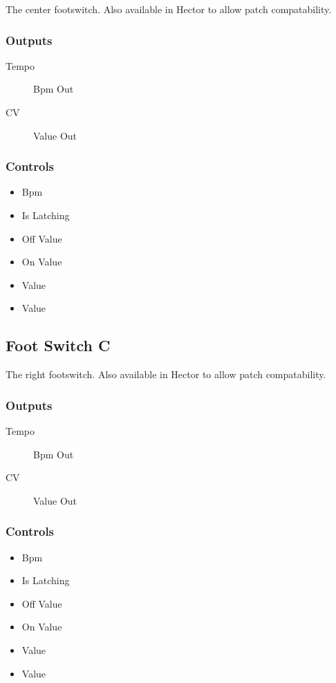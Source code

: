 The center footswitch. Also available in Hector to allow patch compatability.



\subsubsection{Outputs}
\begin{description}
\item [Tempo] Bpm Out
\item [CV] Value Out
\end{description}

\subsubsection{Controls}
\begin{itemize}
\item Bpm
\item Is Latching
\item Off Value
\item On Value
\item Value
\item Value
\end{itemize}

\subsection{Foot Switch C}

The right footswitch. Also available in Hector to allow patch compatability.



\subsubsection{Outputs}
\begin{description}
\item [Tempo] Bpm Out
\item [CV] Value Out
\end{description}

\subsubsection{Controls}
\begin{itemize}
\item Bpm
\item Is Latching
\item Off Value
\item On Value
\item Value
\item Value
\end{itemize}

